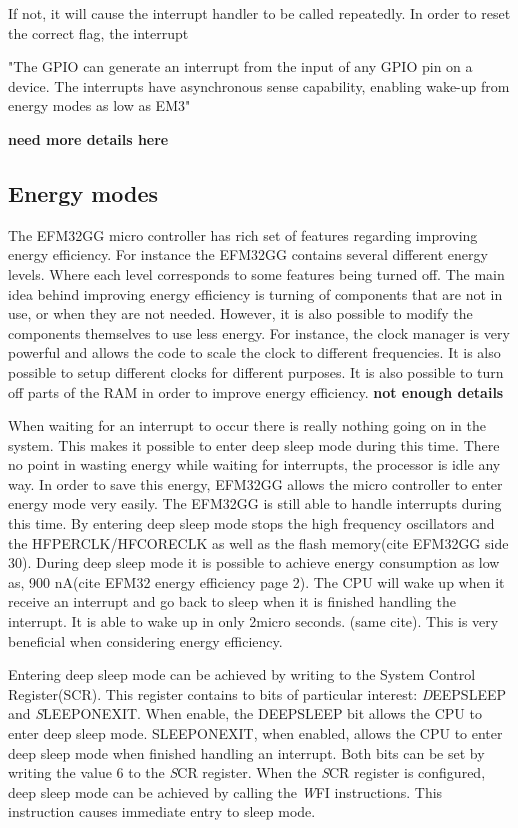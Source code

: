 If not, it will cause the interrupt handler to be called repeatedly. In order to reset the correct flag, the interrupt 



"The GPIO can generate an interrupt from the input of any GPIO pin on a device. The interrupts have asynchronous sense capability, enabling wake-up from energy modes as low as EM3" 


{\bf need more details here}


\subsection{Energy modes}\label{ch:energy_modes} 
The EFM32GG micro controller has rich set of features regarding improving energy efficiency. For instance the EFM32GG contains several different energy levels. Where each level corresponds to some features being turned off. The main idea behind improving energy efficiency is turning of components that are not in use, or when they are not needed. However, it is also possible to modify the components themselves to use less energy. For instance, the clock manager is very powerful and allows the code to scale the clock to different frequencies. It is also possible to setup different clocks for different purposes. It is also possible to turn off parts of the RAM in order to improve energy efficiency. {\bf not enough details}


When waiting for an interrupt to occur there is really nothing going on in the system. This makes it possible to enter deep sleep mode during this time. There no point in wasting energy while waiting for interrupts, the processor is idle any way. In order to save this energy, EFM32GG allows the micro controller to enter energy mode very easily. The EFM32GG is still able to handle interrupts during this time. By entering deep sleep mode stops the high frequency oscillators and the HFPERCLK/HFCORECLK as well as the flash memory(cite EFM32GG side 30). During deep sleep mode it is possible to achieve energy consumption as low as, 900 nA(cite EFM32 energy efficiency page 2). The CPU will wake up when it receive an interrupt and go back to sleep when it is finished handling the interrupt. It is able to wake up in only 2micro seconds. (same cite). This is very beneficial when considering energy efficiency.   

Entering deep sleep mode can be achieved by writing to the System Control Register(SCR). This register contains to bits of particular interest: \emph DEEPSLEEP and \emph SLEEPONEXIT. When enable, the DEEPSLEEP bit allows the CPU to enter deep sleep mode. SLEEPONEXIT, when enabled, allows the CPU to enter deep sleep mode when finished handling an interrupt. Both bits can be set by writing the value 6 to the \emph SCR register. When the \emph SCR register is configured, deep sleep mode can be achieved by calling the \emph WFI instructions. This instruction causes immediate entry to sleep mode. 


   

















